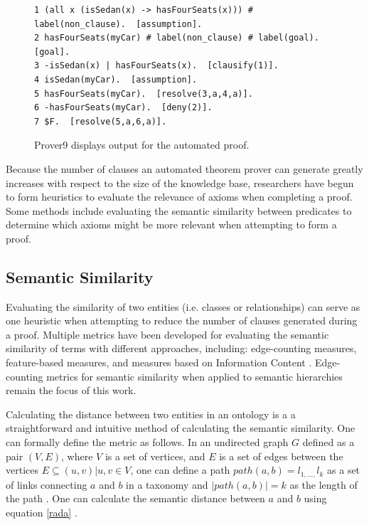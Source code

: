 \documentclass{article}
\begin{document}
\begin{figure}[h]
\begin{verbatim}
1 (all x (isSedan(x) -> hasFourSeats(x))) # label(non_clause).  [assumption].
2 hasFourSeats(myCar) # label(non_clause) # label(goal).  [goal].
3 -isSedan(x) | hasFourSeats(x).  [clausify(1)].
4 isSedan(myCar).  [assumption].
5 hasFourSeats(myCar).  [resolve(3,a,4,a)].
6 -hasFourSeats(myCar).  [deny(2)].
7 $F.  [resolve(5,a,6,a)].
\end{verbatim}
\caption{Prover9 displays output for the automated proof. }
\label{fig:prover9out}
\end{figure}

Because the number of clauses an automated theorem prover can generate greatly increases with respect to the size of the knowledge base, researchers have begun to form heuristics to evaluate the relevance of axioms when completing a proof. Some methods include evaluating the semantic similarity between predicates to determine which axioms might be more relevant when attempting to form a proof. 

\subsection{Semantic Similarity}
Evaluating the similarity of two entities (i.e. classes or relationships) can serve as one heuristic when attempting to reduce the number of clauses generated during a proof. Multiple metrics have been developed for evaluating the semantic similarity of terms with different approaches, including: edge-counting measures, feature-based measures, and measures based on Information Content \cite{sanchez2012ontology} \cite{rodriguez1999assessing} \cite{roederer2009divvy}.  Edge-counting metrics for semantic similarity when applied to semantic hierarchies remain the focus of this work. 

Calculating the distance between two entities in an ontology is a a straightforward and intuitive method of calculating the semantic similarity. One can formally define the metric as follows. In an undirected graph $G$ defined as a pair $(V,E)$, where $V$ is a set of vertices, and $E$ is a set of edges between the vertices $E \subseteq {(u,v) | u, v \in V}$, one can define a path $path(a,b)=l_{1,\dots ,}l_k$ as a set of links connecting $a$ and $b$ in a taxonomy and $\lvert path(a,b) \rvert = k$ as the length of the path \cite{sanchez2012ontology}. One can calculate the semantic distance between $a$ and $b$ using equation \ref{rada} \cite{rada1989development}.
\end{document}
